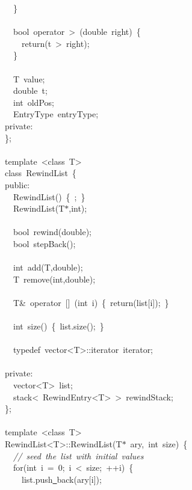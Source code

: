 {\ \ \}\\
\ \\
\ \ bool\ operator\ >{}\ (double\ right)\ \{\\
\ \ \ \ return(t\ >{}\ right);\\
\ \ \}\\
\ \\
\ \ T\ value;\\
\ \ double\ t;\\
\ \ int\ oldPos;\\
\ \ EntryType\ entryType;\\
private:\\
\};\\
\ \\
template\ <{}class\ T>{}\\
class\ RewindList\ \{\\
public:\\
\ \ RewindList()\ \{\ ;\ \}\\
\ \ RewindList(T$\ast$,int);\\
\ \\
\ \ bool\ rewind(double);\\
\ \ bool\ stepBack();\\
\ \\
\ \ int\ add(T,double);\\
\ \ T\ remove(int,double);\\
\ \\
\ \ T\&\ operator\ []\ (int\ i)\ \{\ return(list[i]);\ \}\\
\ \\
\ \ int\ size()\ \{\ list.size();\ \}\\
\ \\
\ \ typedef\ vector<{}T>{}::iterator\ iterator;\\
\ \\
private:\\
\ \ vector<{}T>{}\ list;\\
\ \ stack<{}\ RewindEntry<{}T>{}\ >{}\ rewindStack;\\
\};\\
\ \\
template\ <{}class\ T>{}\\
RewindList<{}T>{}::RewindList(T$\ast$\ ary,\ int\ size)\ \{\\
\ \ \textsl{//\ seed\ the\ list\ with\ initial\ values}\\
\ \ for(int\ i\ =\ 0;\ i\ <{}\ size;\ ++i)\ \{\\
\ \ \ \ list.push\underline\ back(ary[i]);\\
}
